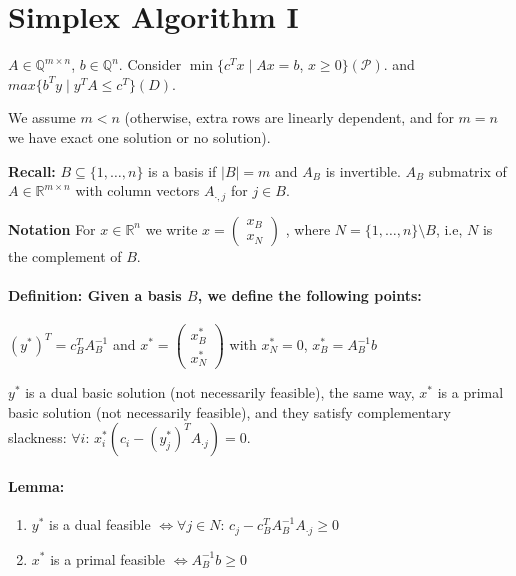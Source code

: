 \documentclass[main]{subfiles}
\begin{document}

\section{Simplex Algorithm I}

$A \in \mathbb{Q}^{m \times n}$, $b \in \mathbb{Q}^n$. Consider $\min \{c^T x 
\mid Ax = b$, $x \geq 0 \} (\mathcal{P})$. and $max \{b^T y \mid y^T A \leq c^T 
\}(D)$.

We assume $m < n$ (otherwise, extra rows are linearly dependent, and for $m=n$
we have exact one solution or no solution).

\textbf{Recall:} $B \subseteq \{1, \dots, n \}$ is a basis if $|B| = m$ and
$A_B$ is invertible. $A_B$ submatrix of $A \in \mathbb{R}^{m \times n}$ with
column vectors $A_{\cdot , j}$ for $j \in B$.

\textbf{Notation} For $x \in \mathbb{R}^n$ we write
$x =
\begin{pmatrix}
x_B \\
x_N
\end{pmatrix}$
, where $N = \{1, \dots, n \}\setminus B$, i.e, $N$ is the complement of $B$.

\paragraph{Definition: Given a basis $B$, we define the following points:}
$(y^*)^T = c^T_B A^{-1}_B$ and
$x^* = 
\begin{pmatrix}
x^*_B \\
x^*_N
\end{pmatrix}$ with $x^*_N = 0$, $x^*_B = A^{-1}_B b$

$y^*$ is a dual basic solution (not necessarily feasible), the same way, $x^*$
is a primal basic solution (not necessarily feasible), and they satisfy 
complementary slackness: $\forall i$: $x^*_i (c_i -(y^*_j)^T A_{\cdot j}) = 0$.

\paragraph{Lemma:}
\begin{enumerate}
\item $y^*$ is a dual feasible $\iff \forall j \in N$: $c_j - 
c_B^T A^{-1}_B A_{\cdot j} \geq 0$
\item $x^*$ is a primal feasible $\iff A^{-1}_B b \geq 0$
\end{enumerate}
\end{document}
